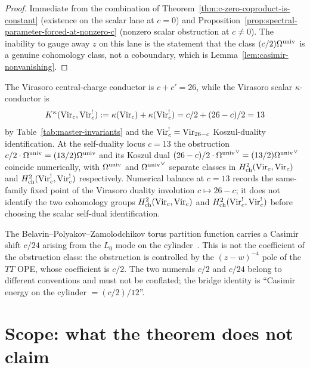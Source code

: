 \begin{proof}
Immediate from the combination of
Theorem~\ref{thm:c-zero-coproduct-is-constant} (existence on the
scalar lane at $c = 0$) and
Proposition~\ref{prop:spectral-parameter-forced-at-nonzero-c}
(nonzero scalar obstruction at $c \neq 0$). The inability to gauge
away $z$ on this lane is the statement that the class
$(c/2) \Omega^{\mathrm{univ}}$ is a genuine cohomology class, not a coboundary, which
is Lemma~\ref{lem:casimir-nonvanishing}.
\end{proof}

\begin{remark}
\label{rem:comparison-with-ktheory-anomaly}
\ClaimStatusProvedElsewhere
The Virasoro central-charge conductor is $c+c'=26$, while the
Virasoro scalar $\kappa$-conductor is
\[
K^\kappa(\mathrm{Vir}_{c},\mathrm{Vir}_{c}^{!})
:=\kappa(\mathrm{Vir}_{c}) + \kappa(\mathrm{Vir}_{c}^{!})
= c/2 + (26 - c)/2 = 13
\]
by Table~\ref{tab:master-invariants} and the $\mathrm{Vir}_{c}^{!} =
\mathrm{Vir}_{26 - c}$ Koszul-duality identification. At the
self-duality locus $c = 13$ the obstruction $c/2 \cdot \Omega^{\mathrm{univ}} = (13/2)
\Omega^{\mathrm{univ}}$ and its Koszul dual $(26 - c)/2 \cdot {\Omega^{\mathrm{univ}}}^{\vee} = (13/2)
{\Omega^{\mathrm{univ}}}^{\vee}$ coincide numerically, with $\Omega^{\mathrm{univ}}$ and ${\Omega^{\mathrm{univ}}}^{\vee}$
separate classes in $H^{2}_{\mathrm{ch}}(\mathrm{Vir}_{c}, \mathrm{Vir}_{c})$ and $H^{2}_{\mathrm{ch}}(\mathrm{Vir}_{c}^{!},
\mathrm{Vir}_{c}^{!})$ respectively. Numerical balance at $c = 13$ records the
same-family fixed point of the Virasoro duality involution
$c\mapsto 26-c$; it does not identify the two cohomology groups
$H^{2}_{\mathrm{ch}}(\mathrm{Vir}_{c}, \mathrm{Vir}_{c})$ and $H^{2}_{\mathrm{ch}}(\mathrm{Vir}_{c}^{!}, \mathrm{Vir}_{c}^{!})$ before
choosing the scalar self-dual identification.
\end{remark}

\begin{remark}
\label{rem:bpz-c-over-24-distinction}
The Belavin--Polyakov--Zamolodchikov torus partition function carries
a Casimir shift $c/24$ arising from the $L_{0}$ mode on the
cylinder~\cite{BPZ84}. This is not the coefficient of the obstruction
class: the obstruction is controlled by the $(z - w)^{-4}$ pole of the
$TT$ OPE, whose coefficient is $c/2$. The two numerals $c/2$ and
$c/24$ belong to different conventions and must not be conflated;
the bridge identity is ``Casimir energy on the cylinder $= (c/2)/12$''.
\end{remark}

\section{Scope: what the theorem does not claim}
\label{sec:anomaly-scope-boundary}

